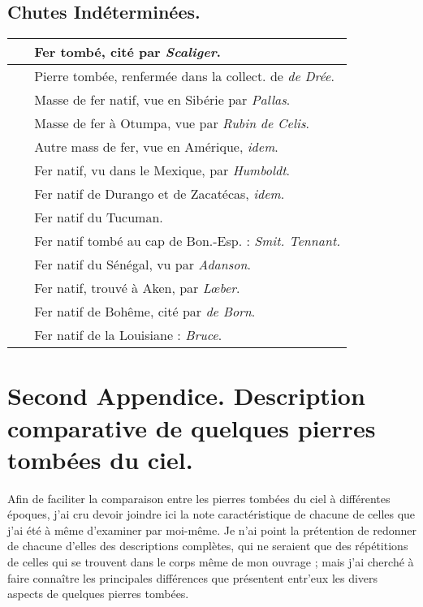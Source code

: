 \documentclass[a4paper, 12pt, oneside, french]{article}
\begin{document}
\subsection{Chutes Indéterminées.}
\begin{center}
    \begin{longtable}{r l}
    \hline
        ~ & Fer tombé, cité par \emph{Scaliger}.   \\ \hline
        ~ & Pierre tombée, renfermée dans la collect. de \emph{de Drée}.   \\ \hline
        ~ & Masse de fer natif, vue en Sibérie par \emph{Pallas}.   \\ \hline
        ~ & Masse de fer à Otumpa, vue par \emph{Rubin de Celis}.   \\ \hline
        ~ & Autre mass de fer, vue en Amérique, \emph{idem}.   \\ \hline
        ~ & Fer natif, vu dans le Mexique, par \emph{Humboldt}.   \\ \hline
        ~ & Fer natif de Durango et de Zacatécas, \emph{idem}.   \\ \hline
        ~ & Fer natif du Tucuman.   \\ \hline
        ~ & Fer natif tombé au cap de Bon.-Esp. : \emph{Smit. Tennant.} \\ \hline
        ~ & Fer natif du Sénégal, vu par \emph{Adanson}.   \\ \hline
        ~ & Fer natif, trouvé à Aken, par \emph{Lœber}.   \\ \hline
        ~ & Fer natif de Bohême, cité par \emph{de Born}.   \\ \hline
        ~ & Fer natif de la Louisiane : \emph{Bruce}. \\ \hline
    \end{longtable}
\end{center}
\clearpage
\section{Second Appendice. Description comparative de quelques pierres tombées du ciel.}
Afin de faciliter la comparaison entre les pierres tombées du ciel à différentes époques, j'ai cru devoir joindre ici la note caractéristique de chacune de celles que j'ai été à même d'examiner par moi-même. Je n'ai point la prétention de redonner de chacune d'elles des descriptions complètes, qui ne seraient que des répétitions de celles qui se trouvent dans le corps même de mon ouvrage ; mais j'ai cherché à faire connaître les principales différences que présentent entr'eux les divers aspects de quelques pierres tombées.
\end{document}
